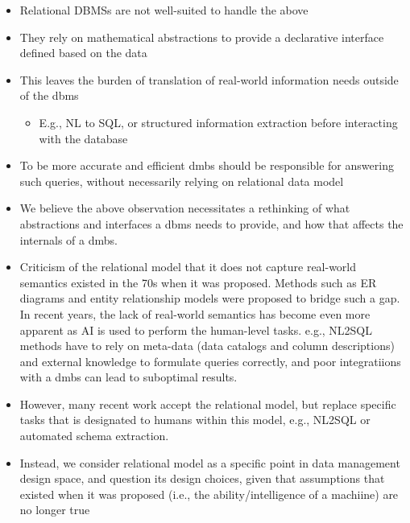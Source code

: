 \begin{itemize}
    \item  Relational DBMSs are not well-suited to handle the above
    \item They rely on mathematical abstractions to provide a declarative interface defined based on the data
    \item This leaves the burden of translation of real-world information needs outside of the dbms
    \begin{itemize}
        \item E.g., NL to SQL, or structured information extraction before interacting with the database
    \end{itemize}
    \item To be more accurate and efficient dmbs should be responsible for answering such queries, without necessarily relying on relational data model
\end{itemize}


\begin{itemize}
    \item We believe the above observation necessitates a rethinking of what abstractions and interfaces a dbms needs to provide, and how that affects the internals of a dmbs.
    \item Criticism of the relational model that it does not capture real-world semantics existed in the 70s when it was proposed. Methods such as ER diagrams and entity relationship models were proposed to bridge such a gap. In recent years, the lack of real-world semantics has become even more apparent as AI is used to perform the human-level tasks. e.g., NL2SQL methods have to rely on meta-data (data catalogs and column descriptions) and external knowledge to formulate queries correctly, and poor integratiions with a dmbs can lead to suboptimal results.  
    \item  However, many recent work accept the relational model, but replace specific tasks that is designated to humans within this model, e.g., NL2SQL or automated schema extraction. 
    \item Instead, we consider relational model as a specific point in data management design space, and question its design choices, given that assumptions that existed when it was proposed  (i.e., the ability/intelligence of a machiine) are no longer true
\end{itemize}
    



